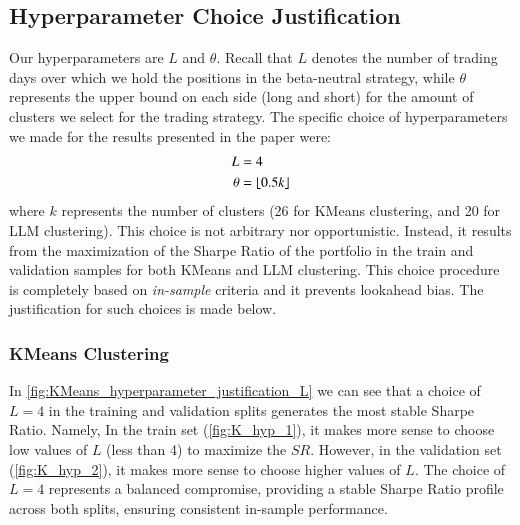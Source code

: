 \subsection{Hyperparameter Choice Justification} \label{sec:A2}
Our hyperparameters are $L$ and $\theta$. Recall that $L$ denotes the number of trading days over which we hold the positions in the beta-neutral strategy, while $\theta$ represents the upper bound on each side (long and short) for the amount of clusters we select for the trading strategy. The specific choice of hyperparameters we made for the results presented in the paper were:
\begin{align*}
L &= 4
\\
\theta &= \lfloor 0.5k \rfloor
\end{align*}
where $k$ represents the number of clusters (26 for KMeans clustering, and 20 for LLM clustering). This choice is not arbitrary nor opportunistic. Instead, it results from the maximization of the Sharpe Ratio of the portfolio in the train and validation samples for both KMeans and LLM clustering. This choice procedure is completely based on \textit{in-sample} criteria and it prevents lookahead bias. The justification for such choices is made below.

\subsubsection{KMeans Clustering}

In \cref{fig:KMeans_hyperparameter_justification_L} we can see that a choice of $L=4$ in the training and validation splits generates the most stable Sharpe Ratio. Namely, In the train set (\cref{fig:K_hyp_1}), it makes more sense to choose low values of $L$ (less than 4) to maximize the $SR$. However, in the validation set (\cref{fig:K_hyp_2}), it makes more sense to choose higher values of $L$. The choice of $L=4$ represents a balanced compromise, providing a stable Sharpe Ratio profile across both splits, ensuring consistent in-sample performance.

